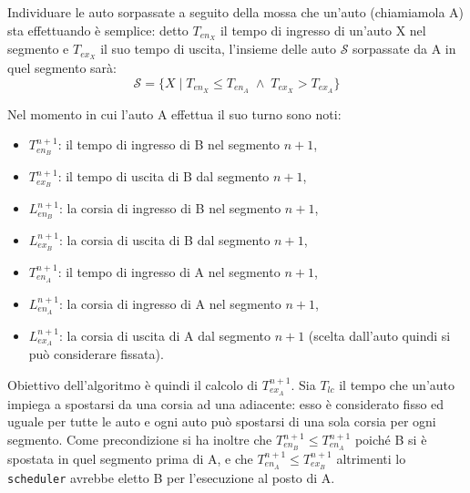 \documentclass[a4paper]{report}
\begin{document}
Individuare le auto sorpassate a seguito della mossa che un'auto (chiamiamola A) sta effettuando è semplice: detto $T_{en_X}$ il tempo di ingresso di un'auto X nel segmento e $T_{ex_X}$ il suo tempo di uscita, l'insieme delle auto $\mathcal{S}$ sorpassate da A in quel segmento sarà:
\[ \mathcal{S} = \{ X \mid T_{en_X} \leq T_{en_A} \;\wedge\; T_{ex_X} > T_{ex_A}\} \]

Nel momento in cui l'auto A effettua il suo turno sono noti:
\begin{itemize}
\item $T_{en_B}^{n+1}$: il tempo di ingresso di B nel segmento $n+1$,
\item $T_{ex_B}^{n+1}$: il tempo di uscita di B dal segmento $n+1$,
\item $L_{en_B}^{n+1}$: la corsia di ingresso di B nel segmento $n+1$,
\item $L_{ex_B}^{n+1}$: la corsia di uscita di B dal segmento $n+1$,
\item $T_{en_A}^{n+1}$: il tempo di ingresso di A nel segmento $n+1$,
\item $L_{en_A}^{n+1}$: la corsia di ingresso di A nel segmento $n+1$,
\item $L_{ex_A}^{n+1}$: la corsia di uscita di A dal segmento $n+1$ (scelta dall'auto quindi si può considerare fissata).
\end{itemize}
Obiettivo dell'algoritmo è quindi il calcolo di $T_{ex_A}^{n+1}$. Sia $T_{lc}$ il tempo che un'auto impiega a spostarsi da una corsia ad una adiacente: esso è considerato fisso ed uguale per tutte le auto e ogni auto può spostarsi di una sola corsia per ogni segmento.
Come precondizione si ha inoltre che $T_{en_B}^{n+1} \leq T_{en_A}^{n+1}$ poiché B si è spostata in quel segmento prima di A, e che $T_{en_A}^{n+1} \leq T_{ex_B}^{n+1}$ altrimenti lo \texttt{scheduler} avrebbe eletto B per l'esecuzione al posto di A.
\end{document}
